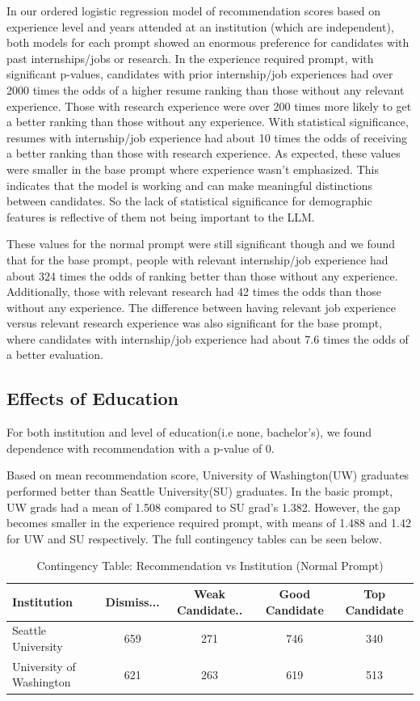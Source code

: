\documentclass[11pt,letterpaper]{article}
\begin{document}
In our ordered logistic regression model of recommendation scores based on experience level and years attended at an institution (which are independent), both models for each prompt showed an enormous preference for candidates with past internships/jobs or research. In the experience required prompt, with significant p-values, candidates with prior internship/job experiences had over 2000 times the odds of a higher resume ranking than those without any relevant experience. Those with research experience were over 200 times more likely to get a better ranking than those without any experience. With statistical significance, resumes with internship/job experience had about 10 times the odds of receiving a better ranking than those with research experience. As expected, these values were smaller in the base prompt where experience wasn't emphasized. This indicates that the model is working and can make meaningful distinctions between candidates. So the lack of statistical significance for demographic features is reflective of them not being important to the LLM.
 
These values for the normal prompt were still significant though and we found that for the base prompt, people with relevant internship/job experience had about 324 times the odds of ranking better than those without any experience. Additionally, those with relevant research had 42 times the odds than those without any experience. The difference between having relevant job experience versus relevant research experience was also significant for the base prompt, where candidates with internship/job experience had about 7.6 times the odds of a better evaluation.

\subsection{Effects of Education}

For both institution and level of education(i.e none, bachelor's), we found dependence with recommendation with a p-value of 0.

Based on mean recommendation score, University of Washington(UW) graduates performed better than Seattle University(SU) graduates. In the basic prompt, UW grads had a mean of 1.508 compared to SU grad's 1.382. However, the gap becomes smaller in the experience required prompt, with means of 1.488 and 1.42 for UW and SU respectively. The full contingency tables can be seen below.

\begin{table}[h]
\centering
\caption{Contingency Table: Recommendation vs Institution (Normal Prompt)}
\begin{tabular}{lcccc}
\hline
\textbf{Institution} & \textbf{Dismiss...} & \textbf{Weak Candidate..} & \textbf{Good Candidate} & \textbf{Top Candidate} \\
\hline
Seattle University & 659 & 271 & 746 & 340 \\
University of Washington & 621 & 263 & 619 & 513 \\
\hline
\end{tabular}

\end{table}
\end{document}
